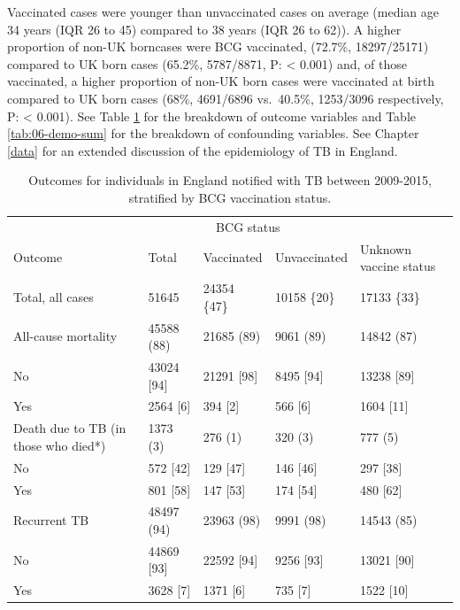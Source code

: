 \documentclass[11pt,twoside]{bristolthesis}
\begin{document}
  Vaccinated cases were younger than unvaccinated cases on average (median age 34 years (IQR 26 to 45) compared to 38 years (IQR 26 to 62)). A higher proportion of non-UK borncases were BCG vaccinated, (72.7\%, 18297/25171) compared to UK born cases (65.2\%, 5787/8871, P: \textless{} 0.001) and, of those vaccinated, a higher proportion of non-UK born cases were vaccinated at birth compared to UK born cases (68\%, 4691/6896 vs.~40.5\%, 1253/3096 respectively, P: \textless{} 0.001). See Table \ref{tab:06-outcome-sum} for the breakdown of outcome variables and Table \ref{tab:06-demo-sum} for the breakdown of confounding variables. See Chapter \ref{data} for an extended discussion of the epidemiology of TB in England.
  \begin{table}[H]
  
  \caption{\label{tab:06-outcome-sum}Outcomes for individuals in England notified with TB between 2009-2015,  stratified by BCG vaccination status.}
  \centering
  \fontsize{8}{10}\selectfont
  \begin{tabular}{>{\raggedright\arraybackslash}p{3cm}llll}
  \toprule
  \multicolumn{2}{c}{ } & \multicolumn{3}{c}{BCG status} \\
  \cmidrule(l{3pt}r{3pt}){3-5}
  Outcome & Total & Vaccinated & Unvaccinated & Unknown vaccine status\\
  \midrule
  Total, all cases & 51645 & 24354 \{47\} & 10158 \{20\} & 17133 \{33\}\\
  All-cause mortality & 45588 (88) & 21685 (89) & 9061 (89) & 14842 (87)\\
  \hspace{1em}No & 43024 [94] & 21291 [98] & 8495 [94] & 13238 [89]\\
  \hspace{1em}Yes & 2564 [6] & 394 [2] & 566 [6] & 1604 [11]\\
  Death due to TB (in those who died*) & 1373 (3) & 276 (1) & 320 (3) & 777 (5)\\
  \addlinespace
  \hspace{1em}No & 572 [42] & 129 [47] & 146 [46] & 297 [38]\\
  \hspace{1em}Yes & 801 [58] & 147 [53] & 174 [54] & 480 [62]\\
  Recurrent TB & 48497 (94) & 23963 (98) & 9991 (98) & 14543 (85)\\
  \hspace{1em}No & 44869 [93] & 22592 [94] & 9256 [93] & 13021 [90]\\
  \hspace{1em}Yes & 3628 [7] & 1371 [6] & 735 [7] & 1522 [10]\\

\end{tabular}
\end{table}
\end{document}
